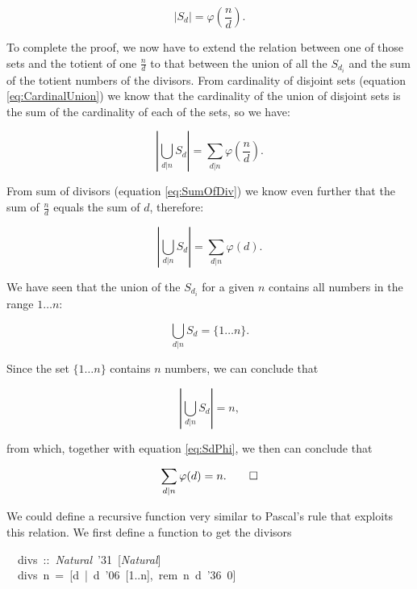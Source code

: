 \documentclass[tikz]{scrreprt}
\newcommand{\texfamily}{\fontfamily{cmtex}\selectfont}
\begin{document}
\begin{equation}
|S_d| = \varphi\left(\frac{n}{d}\right).
\end{equation}

To complete the proof, we now have
to extend the relation between one of those sets and
the totient of one $\frac{n}{d}$ to that between the union of
all the $S_{d_i}$ and the sum of the totient numbers
of the divisors.
From cardinality of disjoint sets (equation \ref{eq:CardinalUnion})
we know that the cardinality of the union of disjoint sets
is the sum of the cardinality of each of the sets,
so we have:

\begin{equation}
\left|\bigcup_{d|n}{S_d}\right| = \sum_{d|n}{\varphi\left(\frac{n}{d}\right)}.
\end{equation}

From sum of divisors (equation \ref{eq:SumOfDiv})
we know even further that the sum of $\frac{n}{d}$ 
equals the sum of $d$, therefore: %

\begin{equation}\label{eq:SdPhi}
\left|\bigcup_{d|n}{S_d}\right| = \sum_{d|n}{\varphi(d)}.
\end{equation}

We have seen that the union of the $S_{d_i}$ for a given $n$
contains all numbers in the range $1\dots n$:

\begin{equation}
\bigcup_{d|n}{S_d} = \lbrace 1\dots n\rbrace.
\end{equation}

Since the set $\lbrace 1\dots n\rbrace$ contains $n$ 
numbers, we can conclude that

\begin{equation}
\left|\bigcup_{d|n}{S_d}\right| = n,
\end{equation}

from which, together with equation \ref{eq:SdPhi}, 
we then can conclude that

\begin{equation}
\sum_{d|n}{\varphi(d)} = n.\qed
\end{equation}

We could define a recursive function
very similar to Pascal's rule that exploits this relation.
We first define a function to get the divisors

\begin{minipage}{\textwidth}
\begin{tabbing}\texfamily
~~divs~::~{\itshape Natural}~\char'31~[{\itshape Natural}]\\
\texfamily ~~divs~n~=~[d~|~d~\char'06~[1..n],~rem~n~d~\char'36~0]
\end{tabbing}
\end{minipage}
\end{document}
